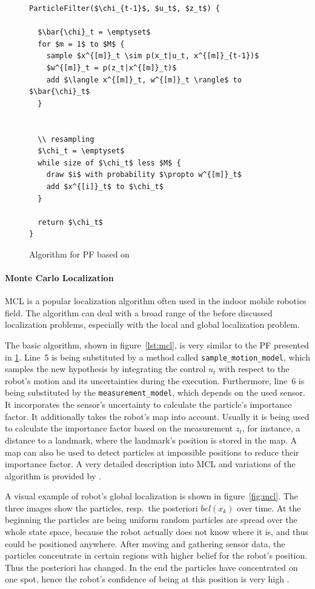 \begin{figure}
\begin{lstlisting}[mathescape]
ParticleFilter($\chi_{t-1}$, $u_t$, $z_t$) {

  $\bar{\chi}_t = \emptyset$
  for $m = 1$ to $M$ {
    sample $x^{[m]}_t \sim p(x_t|u_t, x^{[m]}_{t-1})$
    $w^{[m]}_t = p(z_t|x^{[m]}_t)$
    add $\langle x^{[m]}_t, w^{[m]}_t \rangle$ to $\bar{\chi}_t$
  }
  
  
  \\ resampling
  $\chi_t = \emptyset$
  while size of $\chi_t$ less $M$ {
    draw $i$ with probability $\propto w^{[m]}_t$
    add $x^{[i]}_t$ to $\chi_t$
  }
  
  return $\chi_t$
}
\end{lstlisting}
\caption{Algorithm for \acl{PF} based on \citet{thrun:prob_robo}}
\label{lst:pf}
\end{figure}

\paragraph{Monte Carlo Localization}
\ac{MCL} is a popular localization algorithm often used in the indoor mobile robotics field. The algorithm can deal with a broad range of the before discussed localization problems, especially with the local and global localization problem.

The basic algorithm, shown in figure~\ref{lst:mcl}, is very similar to the \acs{PF} presented in \ref{lst:pf}. Line~5 is being substituted by a method called \texttt{sample\_motion\_model}, which samples the new hypothesis by integrating the control $u_t$ with respect to the robot's motion and its uncertainties during the execution. Furthermore, line~6 is being substituted by the \texttt{measurement\_model}, which depends on the used sensor. It incorporates the sensor's uncertainty to calculate the particle's importance factor. It additionally takes the robot's map into account. Usually it is being used to calculate the importance factor based on the measurement $z_t$, for instance, a distance to a landmark, where the landmark's position is stored in the map. A map can also be used to detect particles at impossible positions to reduce their importance factor. A very detailed description into \acl{MCL} and variations of the algorithm is provided by \citet{thrun:prob_robo}.

A visual example of robot's global localization is shown in figure~\ref{fig:mcl}. The three images show the particles, resp.\ the posteriori $bel(x_k)$ over time. At the beginning the particles are being uniform random particles are spread over the whole state space, because the robot actually does not know where it is, and thus could be positioned anywhere. After moving and gathering sensor data, the particles concentrate in certain regions with higher belief for the robot's position. Thus the posteriori has changed. In the end the particles have concentrated on one spot, hence the robot's confidence of being at this position is very high \citep{thrun:prob_robo}.

